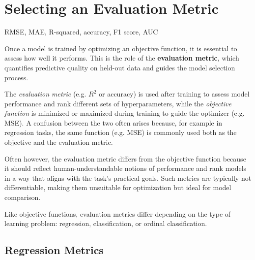 \documentclass[12pt,openany, draft]{book}
\begin{document}
\section{Selecting an Evaluation Metric}

\begin{keywordsbox}
RMSE, MAE, R-squared, accuracy, F1 score, AUC
\end{keywordsbox}

Once a model is trained by optimizing an objective function, it is 
essential to assess how well it performs. This is the role of the 
\textbf{evaluation metric}, which quantifies predictive quality on 
held-out data and guides the model selection process.

\begin{notebox}
The \textit{evaluation metric} 
(e.g. $R^2$ or accuracy) is used after training to assess model performance 
and rank different sets of hyperparameters, while the \textit{objective function} is minimized or maximized during training to guide the optimizer (e.g. MSE). A confusion between the two 
often arises because, for example in regression tasks, the same function (e.g. MSE) is commonly used both as the objective and the evaluation metric.
\end{notebox}

Often however, the evaluation metric differs from the objective function 
because it should reflect human-understandable notions of performance 
and rank models in a way that aligns with the task’s practical goals. 
Such metrics are typically not differentiable, making them unsuitable 
for optimization but ideal for model comparison.
\newline

Like objective functions, evaluation metrics differ depending on the 
type of learning problem: regression, classification, or ordinal 
classification.

\subsection{Regression Metrics}
\end{document}
